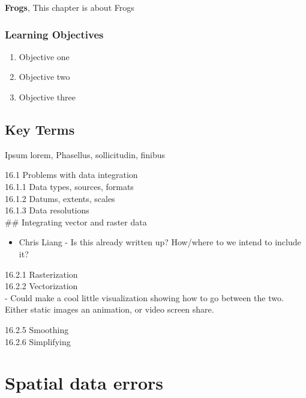 \documentclass[
]{book}
\providecommand{\tightlist}{%
  \setlength{\itemsep}{0pt}\setlength{\parskip}{0pt}}
\begin{document}
\textbf{Frogs}, This chapter is about Frogs

\hypertarget{learning-objectives-3}{%
\subsubsection*{Learning Objectives}\label{learning-objectives-3}}

\begin{enumerate}
\def\labelenumi{\arabic{enumi}.}
\tightlist
\item
  Objective one
\item
  Objective two
\item
  Objective three
\end{enumerate}

\hypertarget{key-terms-3}{%
\subsection*{Key Terms}\label{key-terms-3}}

Ipsum lorem, Phasellus, sollicitudin, finibus

16.1 Problems with data integration\\
16.1.1 Data types, sources, formats\\
16.1.2 Datums, extents, scales\\
16.1.3 Data resolutions\\
\#\# Integrating vector and raster data

\begin{itemize}
\tightlist
\item
  Chris Liang - Is this already written up? How/where to we intend to include it?
\end{itemize}

16.2.1 Rasterization\\
16.2.2 Vectorization\\
- Could make a cool little visualization showing how to go between the two. Either static images an animation, or video screen share.

16.2.5 Smoothing\\
16.2.6 Simplifying

\hypertarget{spatial-data-errors}{%
\section{Spatial data errors}\label{spatial-data-errors}}
\end{document}
